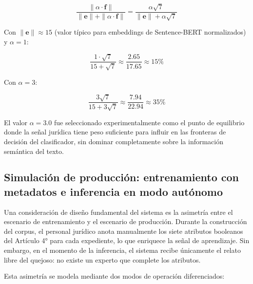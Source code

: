 \begin{equation}
  \frac{\|\alpha \cdot \mathbf{f}\|}{\|\mathbf{e}\| + \|\alpha \cdot \mathbf{f}\|}
  = \frac{\alpha \sqrt{7}}{\|\mathbf{e}\| + \alpha \sqrt{7}}
  \label{eq:contribucion}
\end{equation}

Con $\|\mathbf{e}\| \approx 15$ (valor típico para embeddings de Sentence-BERT
normalizados) y $\alpha = 1$:

\begin{equation*}
  \frac{1 \cdot \sqrt{7}}{15 + \sqrt{7}} \approx \frac{2.65}{17.65} \approx 15\%
\end{equation*}

Con $\alpha = 3$:

\begin{equation*}
  \frac{3\sqrt{7}}{15 + 3\sqrt{7}} \approx \frac{7.94}{22.94} \approx 35\%
\end{equation*}

El valor $\alpha = 3.0$ fue seleccionado experimentalmente como el punto de
equilibrio donde la señal jurídica tiene peso suficiente para influir en las
fronteras de decisión del clasificador, sin dominar completamente sobre la
información semántica del texto.

\subsection{Simulación de producción: entrenamiento con metadatos
            e inferencia en modo autónomo}

Una consideración de diseño fundamental del sistema es la asimetría entre el
escenario de entrenamiento y el escenario de producción. Durante la construcción
del corpus, el personal jurídico anota manualmente los siete atributos booleanos
del Artículo 4° para cada expediente, lo que enriquece la señal de aprendizaje.
Sin embargo, en el momento de la inferencia, el sistema recibe únicamente el
relato libre del quejoso: no existe un experto que complete los atributos.

Esta asimetría se modela mediante dos modos de operación diferenciados:

